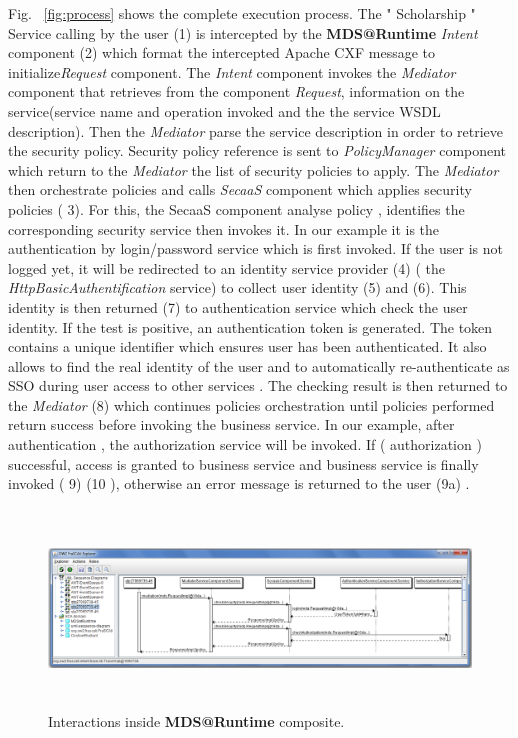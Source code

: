 \documentclass[runningheads,a4paper]{llncs}
\begin{document}
Fig. ~\ref{fig:process} shows the complete execution process. The " Scholarship " Service  calling by the user (1) is intercepted by the \textbf{MDS@Runtime} \emph{Intent} component (2) which format the intercepted Apache CXF message to initialize\emph{Request} component. The \emph{Intent} component invokes the \emph{Mediator} component that retrieves from the component \emph{Request}, information on the service(service name and operation invoked and the  the service WSDL description). Then the \emph{Mediator} parse the service description in order to retrieve the security policy. Security policy reference is sent to \emph{PolicyManager} component which return to the \emph{Mediator} the list of security policies to apply. The \emph{Mediator} then orchestrate policies and calls \emph{SecaaS} component which applies security policies ( 3). For this, the SecaaS component analyse  policy , identifies the corresponding security service then invokes it. In our example it is the authentication by login/password service which is first invoked. If the user is not logged yet, it will be redirected to an identity service provider (4) ( the \emph{HttpBasicAuthentification} service) to collect user identity (5) and (6). This identity is then returned (7) to authentication service which check the user identity. If the test is positive, an authentication token is generated. The token contains a unique identifier which ensures user has been authenticated. It also allows to find the real identity of the user and to automatically re-authenticate as SSO during user access to other services . The checking result is then returned to the \emph{Mediator} (8) which continues policies orchestration until policies performed return success before invoking the business service. In our example, after authentication , the authorization service will be invoked. If  ( authorization ) successful, access is granted to business service and business service is finally invoked ( 9) (10 ), otherwise an error message is returned to the user (9a) .
\begin{figure}  
\center
\includegraphics[height=150pt,width=390pt]{seqGestionEtudiant0.png}
\caption{Interactions inside  \textbf{MDS@Runtime} composite.}
\label{fig:sequence}
\end{figure}
\end{document}
